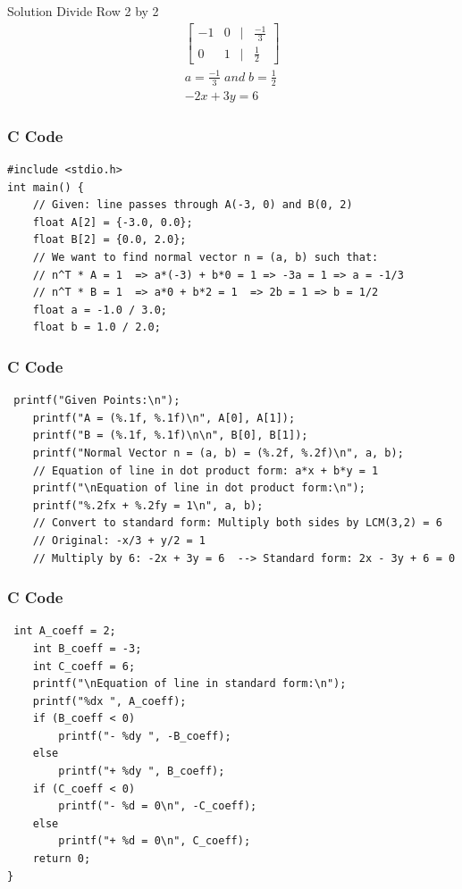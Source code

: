 \documentclass{beamer}
\begin{document}
\begin{frame}{Solution}
  Divide Row 2 by 2
\begin{align}
\begin{bmatrix}
  -1 & 0 & \big| & \frac{-1}{3}\\
  0  &  1 & \big| & \frac{1}{2}
\end{bmatrix}\\
a=\frac{-1}{3}\; and\; b=\frac{1}{2}\\
-2x+3y=6
\end{align}
\end{frame}
\begin{frame}[fragile]
\frametitle{C Code}
\begin{lstlisting}
#include <stdio.h>
int main() {
    // Given: line passes through A(-3, 0) and B(0, 2)
    float A[2] = {-3.0, 0.0};
    float B[2] = {0.0, 2.0};
    // We want to find normal vector n = (a, b) such that:
    // n^T * A = 1  => a*(-3) + b*0 = 1 => -3a = 1 => a = -1/3
    // n^T * B = 1  => a*0 + b*2 = 1  => 2b = 1 => b = 1/2
    float a = -1.0 / 3.0;
    float b = 1.0 / 2.0;
\end{lstlisting}
\end{frame}
\begin{frame}[fragile]
    \frametitle{C Code }
    \begin{lstlisting}
 printf("Given Points:\n");
    printf("A = (%.1f, %.1f)\n", A[0], A[1]);
    printf("B = (%.1f, %.1f)\n\n", B[0], B[1]);
    printf("Normal Vector n = (a, b) = (%.2f, %.2f)\n", a, b);
    // Equation of line in dot product form: a*x + b*y = 1
    printf("\nEquation of line in dot product form:\n");
    printf("%.2fx + %.2fy = 1\n", a, b);
    // Convert to standard form: Multiply both sides by LCM(3,2) = 6
    // Original: -x/3 + y/2 = 1
    // Multiply by 6: -2x + 3y = 6  --> Standard form: 2x - 3y + 6 = 0  
\end{lstlisting}
\end{frame}
\begin{frame}[fragile]
\frametitle{C Code }
\begin{lstlisting}
 int A_coeff = 2;
    int B_coeff = -3;
    int C_coeff = 6;
    printf("\nEquation of line in standard form:\n");
    printf("%dx ", A_coeff);
    if (B_coeff < 0)
        printf("- %dy ", -B_coeff);
    else
        printf("+ %dy ", B_coeff);
    if (C_coeff < 0)
        printf("- %d = 0\n", -C_coeff);
    else
        printf("+ %d = 0\n", C_coeff);
    return 0;
}

\end{lstlisting}
\end{frame}
\end{document}
